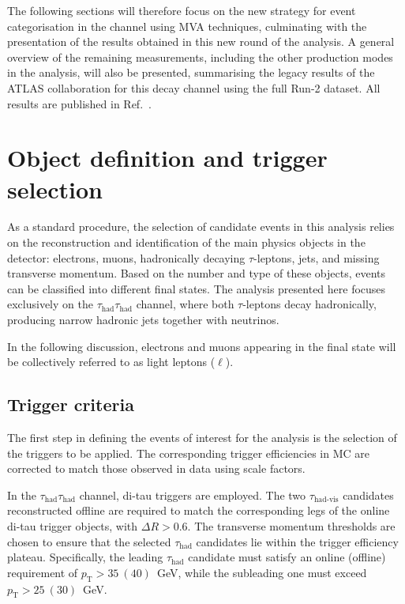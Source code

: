 The following sections will therefore focus on the new strategy for event categorisation in the \ttH channel using MVA techniques, culminating with the presentation of the results obtained in this new round of the \ttHtt analysis. A general overview of the remaining measurements, including the other production modes in the \htautau analysis, will also be presented, summarising the legacy results of the ATLAS collaboration for this decay channel using the full Run-2 dataset. All results are published in Ref.~\cite{differential_htautau}.

\section{Object definition and trigger selection}
\label{sec:object_definiton}

As a standard procedure, the selection of candidate events in this analysis relies on the reconstruction and identification of the main physics objects in the detector: electrons, muons, hadronically decaying $\tau$-leptons, jets, and missing transverse momentum. Based on the number and type of these objects, events can be classified into different final states. The analysis presented here focuses exclusively on the $\tau_{\text{had}}\tau_{\text{had}}$ channel, where both $\tau$-leptons decay hadronically, producing narrow hadronic jets together with neutrinos.  

In the following discussion, electrons and muons appearing in the final state will be collectively referred to as light leptons ($\ell$).

\subsection{Trigger criteria}
\label{subsec:trigger_tth}

The first step in defining the events of interest for the analysis is the selection of the triggers to be applied. The corresponding trigger efficiencies in MC are corrected to match those observed in data using scale factors.  

In the $\tau_{\text{had}}\tau_{\text{had}}$ channel, di-tau triggers are employed. The two $\tau_{\text{had-vis}}$ candidates reconstructed offline are required to match the corresponding legs of the online di-tau trigger objects, with $\Delta R > 0.6$. The transverse momentum thresholds are chosen to ensure that the selected $\tau_{\text{had}}$ candidates lie within the trigger efficiency plateau. Specifically, the leading $\tau_{\text{had}}$ candidate must satisfy an online (offline) requirement of $p_{\text{T}} > 35~(40)$~GeV, while the subleading one must exceed $p_{\text{T}} > 25~(30)$~GeV.  

